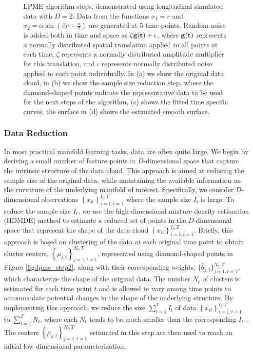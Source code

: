 \documentclass[12pt]{article}
\theoremstyle{definition}
\begin{document}
\begin{figure}
  \caption{{\footnotesize LPME algorithm steps, demonstrated using longitudinal simulated data with $D=2$. Data from the functions $x_1 = r$ and $x_2 = \alpha \sin \left(\beta r + \frac{\pi}{2}\right)$ are generated at 5 time points. Random noise is added both in time and space as $\zeta \bf{g}(t) + \iota$, where $\bf{g}(t)$ represents a normally distributed spatial translation applied to all points at each time, $\zeta$ represents a normally distributed amplitude multiplier for this translation, and $\iota$ represents normally distributed noise applied to each point individually. In (a) we show the original data cloud, in (b) we show the sample size reduction step, where the diamond-shaped points indicate the representative data to be used for the next steps of the algorithm, (c) shows the fitted time specific curves, the surface in (d) shows the estimated smooth surface.} }
  \label{fig:lpme_steps}
\end{figure}


\subsubsection{Data Reduction}

In most practical manifold learning tasks, data are often quite large. We begin by deriving a small number of feature points in $D$-dimensional space that capture the intrinsic structure of the data cloud. This approach is aimed at reducing the sample size of the original data, while maintaining the available information on the curvature of the underlying manifold of interest. Specifically, we consider $D$-dimensional observations $\left\{x_{it}\right\}_{i=1, t=1}^{I_t, T}$ where the sample size $I_t$ is large. To reduce the sample size $I_t$, we use the high-dimensional mixture density estimation (HDMDE) method \citep[see][alg. 1]{mengPrincipalManifoldEstimation2021} to estimate a reduced set of points in the $D$-dimensional space that represent the shape of the data cloud $\left\{x_{it}\right\}_{i=1, t=1}^{I_t, T}$. Briefly, this approach is based on clustering of the data at each original time point to obtain cluster centers, $\left\{\mu_{j, t}\right\}_{j=1, t=1}^{N_t, T}$, represented using diamond-shaped points in Figure \ref{fig:lpme_step2}, along with their corresponding weights, $\{\hat{\theta}_{j, t}\}_{j=1, t=1}^{N_t, T}$, which characterize the shape of the original data. The number $N_t$ of clusters is estimated for each time point $t$ and is allowed to vary among time points to accommodate potential changes in the shape of the underlying structure. By implementing this approach, we reduce the size $\sum_{t=1}^T I_t$ of data $\left\{x_{it}\right\}_{i=1, t=1}^{I_t, T}$ to $\sum_{t=1}^T N_t$, where each $N_t$ tends to be much smaller than the corresponding $I_t$ \citep[see the simulation study presented in][fig. 3(c)]{mengPrincipalManifoldEstimation2021}. The centers $\left\{\mu_{j, t}\right\}_{j=1, t=1}^{N_t, T}$ estimated in this step are then used to reach an initial low-dimensional parameterization.
\end{document}
